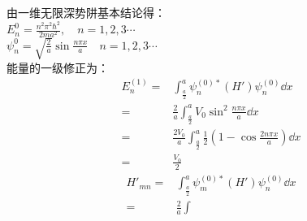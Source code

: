 \subsection{ }
由一维无限深势阱基本结论得：\\

$E^{0}_{n} = \frac{n^{2} \pi^{2} \hbar^{2}}{2ma^{2}},\quad n = 1,2,3\cdots $ \\

$\psi^{0}_{n} = \sqrt{\frac{2}{a}} \sin{\frac{n \pi x}{a}}\quad n = 1,2,3\cdots $ \\

能量的一级修正为：\\
\begin{equation}
\begin{aligned}
E^{(1)}_{n} =& \int^{a}_{\frac{a}{2}} \psi^{(0)*}_{n} (H') \psi^{(0)}_{n} \dd{x} \\
=& \frac{2}{a} \int^{a}_{\frac{a}{2}} V_{0} \sin^{2}{\frac{n \pi x}{a}} \dd{x} \\
=& \frac{2V_{0}}{a} \int^{a}_{\frac{a}{2}} \frac{1}{2} (1-\cos{\frac{2n \pi x}{a}}) \dd{x} \\
=& \frac{V_{0}}{2}
\end{aligned}
\end{equation}
\begin{equation}
\begin{aligned}
H'_{mn} =& \int^{a}_{\frac{a}{2}} \psi^{(0)*}_{m}(H') \psi^{(0)}_{n} \dd{x} \\
=& \frac{2}{a} \int
\end{aligned}
\end{equation}
